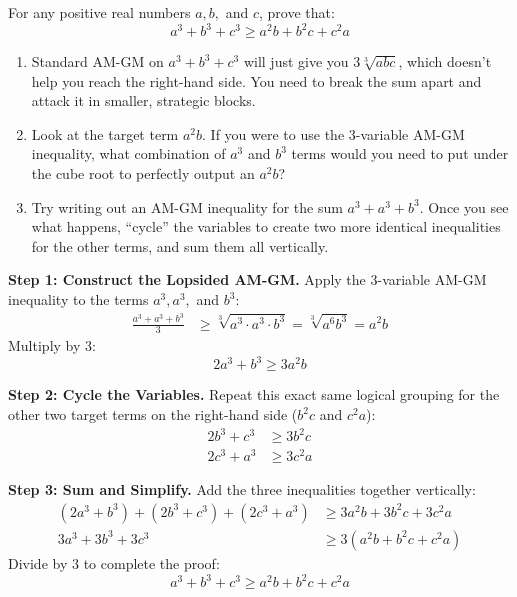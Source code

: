 \begin{problem}
For any positive real numbers $a, b,$ and $c$, prove that:
\[
a^3 + b^3 + c^3 \ge a^2b + b^2c + c^2a
\]
\end{problem}

\begin{hint}
\begin{enumerate}
\item Standard AM-GM on $a^3 + b^3 + c^3$ will just give you $3\sqrt[3]{abc}$, which doesn't help you reach the right-hand side. You need to break the sum apart and attack it in smaller, strategic blocks.
\item Look at the target term $a^2b$. If you were to use the 3-variable AM-GM inequality, what combination of $a^3$ and $b^3$ terms would you need to put under the cube root to perfectly output an $a^2b$?
\item Try writing out an AM-GM inequality for the sum $a^3 + a^3 + b^3$. Once you see what happens, ``cycle'' the variables to create two more identical inequalities for the other terms, and sum them all vertically.
\end{enumerate}
\end{hint}

\begin{solution}
\textbf{Step 1: Construct the Lopsided AM-GM.}
Apply the 3-variable AM-GM inequality to the terms $a^3, a^3,$ and $b^3$:
\begin{align*}
    \frac{a^3 + a^3 + b^3}{3} &\ge \sqrt[3]{a^3 \cdot a^3 \cdot b^3} = \sqrt[3]{a^6b^3} = a^2b
\end{align*}
Multiply by 3:
\[
2a^3 + b^3 \ge 3a^2b
\]

\textbf{Step 2: Cycle the Variables.}
Repeat this exact same logical grouping for the other two target terms on the right-hand side ($b^2c$ and $c^2a$):
\begin{align*}
    2b^3 + c^3 &\ge 3b^2c \\
    2c^3 + a^3 &\ge 3c^2a
\end{align*}

\textbf{Step 3: Sum and Simplify.}
Add the three inequalities together vertically:
\begin{align*}
    (2a^3 + b^3) + (2b^3 + c^3) + (2c^3 + a^3) &\ge 3a^2b + 3b^2c + 3c^2a \\
    3a^3 + 3b^3 + 3c^3 &\ge 3(a^2b + b^2c + c^2a)
\end{align*}
Divide by 3 to complete the proof:
\[
    a^3 + b^3 + c^3 \ge a^2b + b^2c + c^2a
\]
\end{solution}

